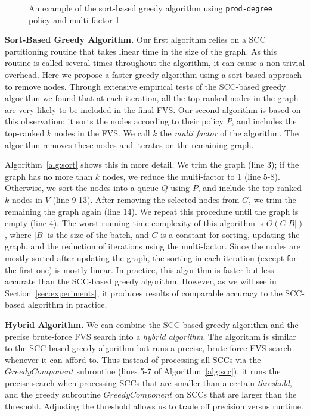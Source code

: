 \begin{figure}[t]
\begin{minipage}[b]{0.19\linewidth}
   		\end{minipage}
  	\vspace{-1em}             
   \caption{An example of the sort-based greedy algorithm using \texttt{prod-degree} policy and multi factor 1}
   \label{fig:simple}               
   \vspace{-1em}    	
\end{figure}

{\bf Sort-Based Greedy Algorithm.} Our first algorithm relies on a SCC partitioning routine that takes linear time in the size of the graph. As this routine is called several times throughout the algorithm, it can cause a non-trivial overhead. Here we propose a faster greedy algorithm using a sort-based approach to remove nodes. Through extensive empirical tests of the SCC-based greedy algorithm we found that at each iteration, all the top ranked nodes in the graph are very likely to be included in the final FVS. Our second algorithm is based on this observation; it sorts the nodes according to their policy $P$, and includes the top-ranked $k$ nodes in the FVS. We call $k$ the \emph{multi factor} of the algorithm. The algorithm removes these nodes and iterates on the remaining graph.

Algorithm~\ref{alg:sort} shows this in more detail. We trim the graph (line 3); if the graph has no more than $k$ nodes, we reduce the multi-factor to 1 (line 5-8). Otherwise, we sort the nodes into a queue $Q$ using $P$, and include the top-ranked $k$ nodes in $V$ (line 9-13).
After removing the selected nodes from $G$, we trim the remaining the graph again (line 14). We repeat this procedure until the graph is empty (line 4). The worst running time complexity of this algorithm is $O(C|B|)$, where $|B|$ is the size of the batch, and $C$ is a constant for sorting, updating the graph, and the reduction of iterations using the multi-factor. Since the nodes are mostly sorted after updating the graph, the sorting in each iteration (except for the first one) is mostly linear. In practice, this algorithm is faster but less accurate than the SCC-based greedy algorithm. However, as we will see in Section~\ref{sec:experiments}, it produces results of comparable accuracy to the SCC-based algorithm in practice.

{\bf Hybrid Algorithm.}
We can combine the SCC-based greedy algorithm and the precise brute-force FVS search into a \emph{hybrid algorithm}. The algorithm is similar to the SCC-based greedy algorithm but runs a precise, brute-force FVS search whenever it can afford to. Thus instead of processing all SCCs via the $GreedyComponent$ subroutine (lines 5-7 of Algorithm~\ref{alg:scc}), it runs the precise search when processing SCCs that are smaller than a certain \emph{threshold}, and the greedy subroutine $GreedyComponent$ on SCCs that are larger than the threshold. Adjusting the threshold allows us to trade off precision versus runtime.


